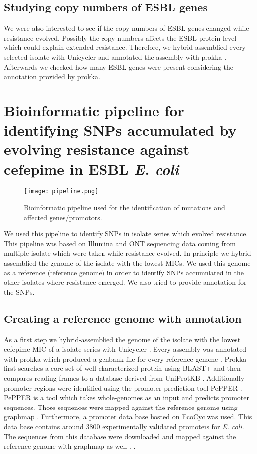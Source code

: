 \subsection{Studying copy numbers of ESBL genes}
We were also interested to see if the copy numbers of ESBL genes changed while resistance evolved. Possibly the copy numbers affects the ESBL protein level which could explain extended resistance. Therefore, we hybrid-assemblied every selected isolate with Unicycler \cite{wick_unicycler:_2017} and annotated the assembly with prokka \cite{seemann_prokka:_2014}. Afterwards we checked how many ESBL genes were present considering the annotation provided by prokka.

\section{Bioinformatic pipeline for identifying SNPs accumulated by evolving resistance against cefepime in ESBL \textit{E. coli}}
\label{section:pipeline}
\begin{figure}
	\texttt{[image: pipeline.png]}
	\caption{Bioinformatic pipeline used for the identification of mutations and affected genes/promotors.}
	\label{figure:pipeline}
\end{figure}
We used this pipeline to identify SNPs in isolate series which evolved resistance. This pipeline was based on Illumina and ONT sequencing data coming from multiple isolate which were taken while resistance evolved. In principle we hybrid-assemblied the genome of the isolate with the lowest MICs. We used this genome as a reference (reference genome) in order to identify SNPs accumulated in the other isolates where resistance emerged. We also tried to provide annotation for the SNPs. 

\subsection{Creating a reference genome with annotation} 
As a first step we hybrid-assemblied the genome of the isolate with the lowest cefepime MIC of a isolate series with Unicycler \cite{wick_unicycler:_2017}. Every assembly was annotated with prokka which produced a genbank file for every reference genome \cite{seemann_prokka:_2014}. Prokka first searches a core set of well characterized protein using BLAST+ and then compares reading frames to a database derived from UniProtKB \cite{seemann_:zap:_2019}. Additionally promoter regions were identified using the promoter prediction tool PePPER \cite{pepper}. PePPER is a tool which takes whole-genomes as an input and predicts promoter sequences. Those sequences were mapped against the reference genome using graphmap \cite{sovic_fast_2016}. Furthermore, a promoter data base hosted on EcoCyc was used. This data base contains around 3800 experimentally validated promoters for \textit{E. coli}\cite{noauthor_smarttable_nodate}. The sequences from this database were downloaded and mapped against the reference genome with graphmap as well \cite{sovic_fast_2016}. 
\label{section:annotatiion_ref}.

